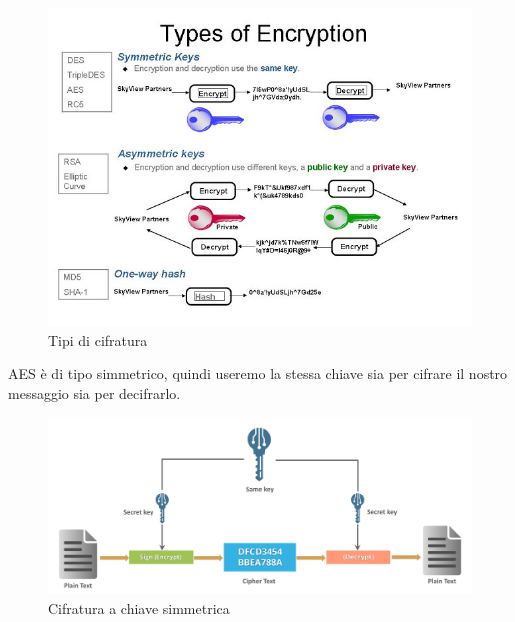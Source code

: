 \begin{figure}[H]
	\centering
	\includegraphics[width=1\textwidth, height=1\textheight, keepaspectratio]{./images/types_of_encryptions/types_of_encryption.png}
	\caption{Tipi di cifratura}
	\label{fig:encryption_types}
\end{figure}

  

\textsf{\small AES è di tipo simmetrico, quindi useremo la stessa chiave sia per cifrare il nostro messaggio sia per decifrarlo. }

\begin{figure}[H]
	\centering
	\includegraphics[width=1\textwidth, height=1\textheight, keepaspectratio]{./images/types_of_encryptions/symmetric_vs_asymmetric/symmetric-key-what-is-cryptography.png}
	\caption{Cifratura a chiave simmetrica}
	\label{fig:symmetric_encryption}
\end{figure}


